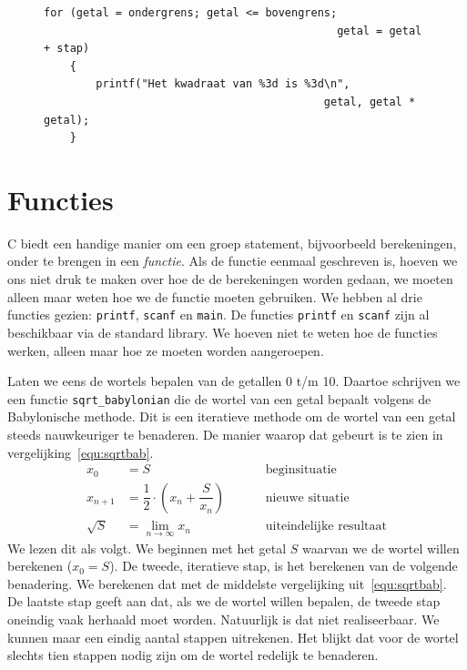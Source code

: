 \begin{figure}[!ht]
\begin{lstlisting}[caption=Gebruik van een \texttt{for}-statement.,label=cod:unfor]
	for (getal = ondergrens; getal <= bovengrens;
                                             getal = getal + stap)
	{
		printf("Het kwadraat van %3d is %3d\n",
                                           getal, getal * getal);
	}
\end{lstlisting}
\end{figure}


\section{Functies}
C biedt een handige manier om een groep statement, bijvoorbeeld berekeningen, onder te brengen in een \textsl{functie}. Als de functie eenmaal geschreven is, hoeven we ons niet druk te maken over hoe de de berekeningen worden gedaan, we moeten alleen maar weten hoe we de functie moeten gebruiken. We hebben al drie functies gezien: \texttt{printf}, \texttt{scanf} en \texttt{main}. De functies \texttt{printf} en \texttt{scanf} zijn al beschikbaar via de standard library. We hoeven niet te weten hoe de functies werken, alleen maar hoe ze moeten worden aangeroepen.

Laten we eens de wortels bepalen van de getallen 0 t/m 10. Daartoe schrijven we een functie \texttt{sqrt\_babylonian} die de wortel van een getal bepaalt volgens de Babylonische methode. Dit is een iteratieve methode om de wortel van een getal steeds nauwkeuriger te benaderen. De manier waarop dat gebeurt is te zien in vergelijking~\eqref{equ:sqrtbab}.
%
\begin{equation}
\label{equ:sqrtbab}
\begin{split}
x_0 &= S &&&& \text{beginsituatie} \\
x_{n+1} &= \dfrac{1}{2}\cdot\left(x_n + \dfrac{S}{x_n}\right) &&&& \text{nieuwe situatie}\\
\sqrt{S} &= \lim_{n\rightarrow\infty} x_n &&&& \text{uiteindelijke resultaat}
\end{split}
\end{equation}
%
We lezen dit als volgt. We beginnen met het getal $S$ waarvan we de wortel willen berekenen ($x_0= S$). De tweede, iteratieve stap, is het berekenen van de volgende benadering. We berekenen dat met de middelste vergelijking uit~\eqref{equ:sqrtbab}. De laatste stap geeft aan dat, als we de wortel willen bepalen, de tweede stap oneindig vaak herhaald moet worden. Natuurlijk is dat niet realiseerbaar. We kunnen maar een eindig aantal stappen uitrekenen. Het blijkt dat voor de wortel slechts tien stappen nodig zijn om de wortel redelijk te benaderen.

